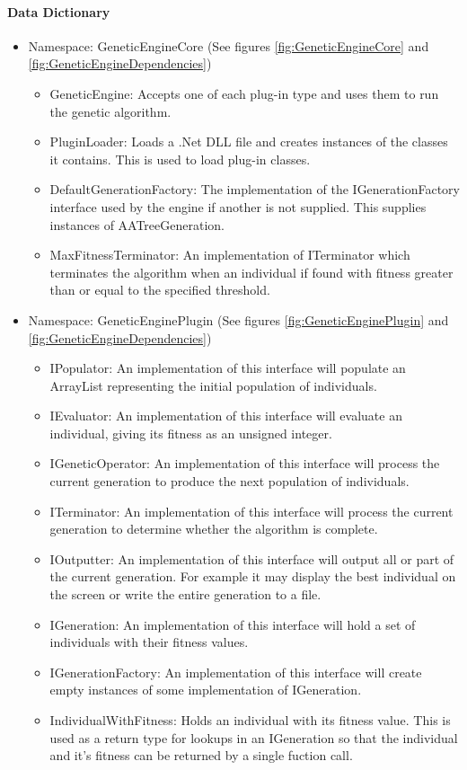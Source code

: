 \paragraph{Data Dictionary}
\begin{itemize}
\item Namespace: GeneticEngineCore (See figures \ref{fig:GeneticEngineCore} and \ref{fig:GeneticEngineDependencies})
	\begin{itemize}
	\item GeneticEngine: Accepts one of each plug-in type and uses them to run the genetic algorithm.
	\item PluginLoader: Loads a .Net DLL file and creates instances of the classes it contains. This is used to load plug-in classes.
	\item DefaultGenerationFactory: The implementation of the IGenerationFactory interface used by the engine if another is not supplied. This supplies instances of AATreeGeneration.
	\item MaxFitnessTerminator: An implementation of ITerminator which terminates the algorithm when an individual if found with fitness greater than or equal to the specified threshold.
	\end{itemize}
	
\item Namespace: GeneticEnginePlugin (See figures \ref{fig:GeneticEnginePlugin} and \ref{fig:GeneticEngineDependencies})
	\begin{itemize}
	\item IPopulator: An implementation of this interface will populate an ArrayList representing the initial population of individuals.
	\item IEvaluator: An implementation of this interface will evaluate an individual, giving its fitness as an unsigned integer.
	\item IGeneticOperator: An implementation of this interface will process the current generation to produce the next population of individuals.
	\item ITerminator: An implementation of this interface will  process the current generation to determine whether the algorithm is complete.
	\item IOutputter: An implementation of this interface will  output all or part of the current generation. For example it may display the best individual on the screen or write the entire generation to a file.
	\item IGeneration: An implementation of this interface will hold a set of individuals with their fitness values.
	\item IGenerationFactory: An implementation of this interface will create empty instances of some implementation of IGeneration.
	\item IndividualWithFitness: Holds an individual with its fitness value. This is used as a return type for lookups in an IGeneration so that the individual and it's fitness can be returned by a single fuction call.
	\end{itemize}
	

\end{itemize}
